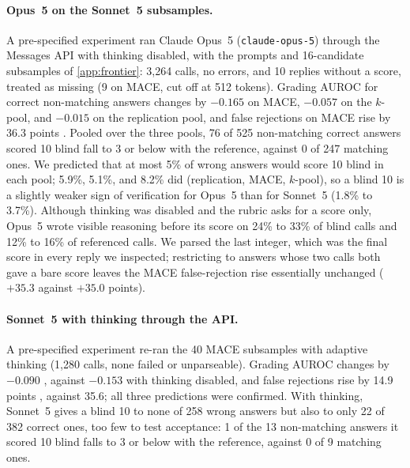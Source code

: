 \paragraph{Opus~5 on the Sonnet~5 subsamples.}
A pre-specified experiment ran Claude Opus~5 (\texttt{claude-opus-5}) through the Messages API with thinking disabled, with the prompts and 16-candidate subsamples of \cref{app:frontier}: 3,264 calls, no errors, and 10 replies without a score, treated as missing (9 on \textsc{MACE}, cut off at 512 tokens). Grading AUROC for correct non-matching answers changes by $-0.165$  on \textsc{MACE}, $-0.057$  on the $k$-pool, and $-0.015$  on the replication pool, and false rejections on \textsc{MACE} rise by 36.3 points . Pooled over the three pools, 76 of 525 non-matching correct answers scored 10 blind fall to 3 or below with the reference, against 0 of 247 matching ones. We predicted that at most 5\% of wrong answers would score 10 blind in each pool; 5.9\%, 5.1\%, and 8.2\% did (replication, \textsc{MACE}, $k$-pool), so a blind 10 is a slightly weaker sign of verification for Opus~5 than for Sonnet~5 (1.8\% to 3.7\%). Although thinking was disabled and the rubric asks for a score only, Opus~5 wrote visible reasoning before its score on 24\% to 33\% of blind calls and 12\% to 16\% of referenced calls. We parsed the last integer, which was the final score in every reply we inspected; restricting to answers whose two calls both gave a bare score leaves the \textsc{MACE} false-rejection rise essentially unchanged ($+35.3$ against $+35.0$ points).\ph

\paragraph{Sonnet~5 with thinking through the API.}
A pre-specified experiment re-ran the 40 \textsc{MACE} subsamples with adaptive thinking (1,280 calls, none failed or unparseable). Grading AUROC changes by $-0.090$ , against $-0.153$ with thinking disabled, and false rejections rise by 14.9 points , against 35.6; all three predictions were confirmed. With thinking, Sonnet~5 gives a blind 10 to none of 258 wrong answers but also to only 22 of 382 correct ones, too few to test acceptance: 1 of the 13 non-matching answers it scored 10 blind falls to 3 or below with the reference, against 0 of 9 matching ones.

